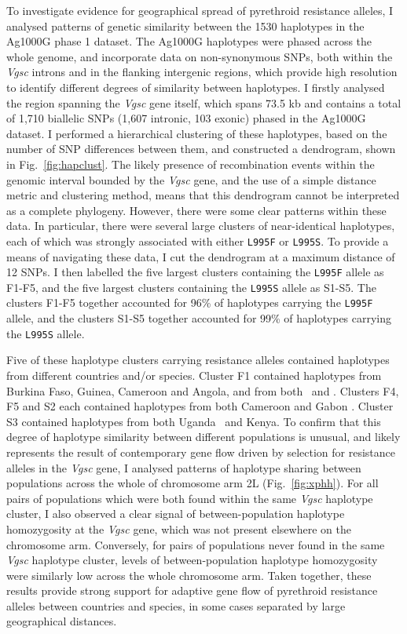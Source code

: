 \documentclass[a4paper,11pt,abstracton,hidelinks]{scrartcl}
\begin{document}
To investigate evidence for geographical spread of pyrethroid resistance alleles, I analysed patterns of genetic similarity between the 1530 haplotypes in the Ag1000G phase 1 dataset.
%
The Ag1000G haplotypes were phased across the whole genome, and incorporate data on non-synonymous SNPs, both within the \textit{Vgsc} introns and in the flanking intergenic regions, which provide high resolution to identify different degrees of similarity between haplotypes.
%
I firstly analysed the region spanning the \textit{Vgsc} gene itself, which spans 73.5 kb and contains a total of 1,710 biallelic SNPs (1,607 intronic, 103 exonic) phased in the Ag1000G dataset.
%
I performed a hierarchical clustering of these haplotypes, based on the number of SNP differences between them, and constructed a dendrogram, shown in Fig.~\ref{fig:hapclust}.
%
The likely presence of recombination events within the genomic interval bounded by the \textit{Vgsc} gene, and the use of a simple distance metric and clustering method, means that this dendrogram cannot be interpreted as a complete phylogeny.
%
However, there were some clear patterns within these data.
%
In particular, there were several large clusters of near-identical haplotypes, each of which was strongly associated with either \texttt{L995F} or \texttt{L995S}.
%
To provide a means of navigating these data, I cut the dendrogram at a maximum distance of 12 SNPs.
%
I then labelled the five largest clusters containing the \texttt{L995F} allele as F1-F5, and the five largest clusters containing the \texttt{L995S} allele as S1-S5.
%
The clusters F1-F5 together accounted for 96\% of haplotypes carrying the \texttt{L995F} allele, and the clusters S1-S5 together accounted for 99\% of haplotypes carrying the \texttt{L995S} allele.


Five of these haplotype clusters carrying resistance alleles contained haplotypes from different countries and/or species.
%
Cluster F1 contained haplotypes from Burkina Faso, Guinea, Cameroon and Angola, and from both \agam\ and \acol.
%
Clusters F4, F5 and S2 each contained haplotypes from both Cameroon and Gabon \agam.
%
Cluster S3 contained haplotypes from both Uganda \agam\ and Kenya.
%
To confirm that this degree of haplotype similarity between different populations is unusual, and likely represents the result of contemporary gene flow driven by selection for resistance alleles in the \textit{Vgsc} gene, I analysed patterns of haplotype sharing between populations across the whole of chromosome arm 2L (Fig.~\ref{fig:xphh}).
%
For all pairs of populations which were both found within the same \textit{Vgsc} haplotype cluster, I also observed a clear signal of between-population haplotype homozygosity at the \textit{Vgsc} gene, which was not present elsewhere on the chromosome arm.
%
Conversely, for pairs of populations never found in the same \textit{Vgsc} haplotype cluster, levels of between-population haplotype homozygosity were similarly low across the whole chromosome arm.
%
Taken together, these results provide strong support for adaptive gene flow of pyrethroid resistance alleles between countries and species, in some cases separated by large geographical distances.
\end{document}
